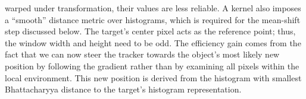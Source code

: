 \documentclass[a4paper,11pt]{article}
\begin{document}
		warped under transformation, their values are less reliable. A kernel
		also imposes a ``smooth'' distance metric over histograms, which is
		required for the mean-shift step discussed below. The target's center
		pixel acts as the reference point; thus, the window width and height
		need to be odd. The efficiency gain comes from the fact that we can
		now steer the tracker towards the object's most likely new position
		by following the gradient rather than by examining all pixels within
		the local environment. This new position is derived from the histogram
		with smallest Bhattacharyya distance to the target's histogram representation.
		\\ \\
\end{document}
